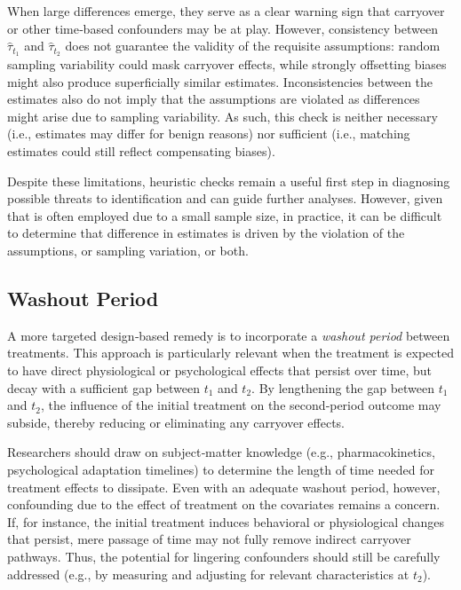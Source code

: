 When large differences emerge, they serve as a clear warning sign that carryover or other time‐based confounders may be at play.  However, consistency between \(\hat{\tau}_{t_1}\) and \(\hat{\tau}_{t_2}\) does not guarantee the validity of the requisite assumptions: random sampling variability could mask carryover effects, while strongly offsetting biases might also produce superficially similar estimates. Inconsistencies between the estimates also do not imply that the assumptions are violated as differences might arise due to sampling variability. As such, this check is neither necessary (i.e., estimates may differ for benign reasons) nor sufficient (i.e., matching estimates could still reflect compensating biases).

Despite these limitations, heuristic checks remain a useful first step in diagnosing possible threats to identification and can guide further analyses. However, given that \cwsd{} is often employed due to a small sample size, in practice, it can be difficult to determine that difference in estimates is driven by the violation of the assumptions, or sampling variation, or both.

\subsection{Washout Period}

A more targeted design‐based remedy is to incorporate a \textit{washout period} between treatments. This approach is particularly relevant when the treatment is expected to have direct physiological or psychological effects that persist over time, but decay with a sufficient gap between $t_1$ and $t_2$. By lengthening the gap between \(t_1\) and \(t_2\), the influence of the initial treatment on the second‐period outcome may subside, thereby reducing or eliminating any carryover effects.  

 Researchers should draw on subject‐matter knowledge (e.g., pharmacokinetics, psychological adaptation timelines) to determine the length of time needed for treatment effects to dissipate. Even with an adequate washout period, however, confounding due to the effect of treatment on the covariates remains a concern. If, for instance, the initial treatment induces behavioral or physiological changes that persist, mere passage of time may not fully remove indirect carryover pathways. Thus, the potential for lingering confounders should still be carefully addressed (e.g., by measuring and adjusting for relevant characteristics at \(t_2\)).


